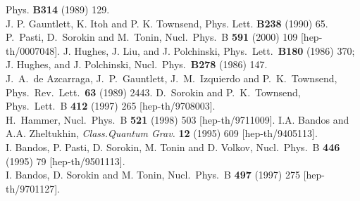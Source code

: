 \documentclass[a4paper,12pt]{article}
\begin{document}
\begin{thebibliography}{999}
{Phys.} {\bf B314} (1989) 129.\\
J. P. Gauntlett, K. Itoh and P. K. Townsend, {Phys. Lett.}
{\bf B238} (1990) 65.
P.~Pasti, D.~Sorokin and M.~Tonin,
Nucl.\ Phys.\ B {\bf 591} (2000) 109 [hep-th/0007048].
J. Hughes, J. Liu, and J. Polchinski,  Phys.\ Lett.\
{\bf B180} (1986) 370;
J. Hughes, and J. Polchinski, Nucl.\ Phys.\
{\bf B278} (1986) 147.\\
J.~A.~de Azcarraga, J.~P.~Gauntlett, J.~M.~Izquierdo and
P.~K.~Townsend,
Phys.\ Rev.\ Lett.\  {\bf 63} (1989) 2443.
\bibitem{Sorokin:1997ps}
D.~Sorokin and P.~K.~Townsend,
Phys.\ Lett.\ B {\bf 412} (1997) 265 [hep-th/9708003].
\\
H.~Hammer,
Nucl.\ Phys.\ B {\bf 521} (1998) 503 [hep-th/9711009].
\bibitem{harm}
 I.A. Bandos and A.A. Zheltukhin,
     {\em Class.Quantum Grav.} {\bf 12} (1995) 609
[hep-th/9405113].\\
I. Bandos, P. Pasti, D. Sorokin, M. Tonin and D. Volkov,
 {Nucl.\ Phys.}\ B {\bf 446} (1995) 79 [hep-th/9501113].
 \\
I. Bandos, D. Sorokin and M. Tonin, {Nucl.\ Phys.}\ B {\bf 497}
(1997) 275 [hep-th/9701127].


\end{thebibliography}
\end{document}
